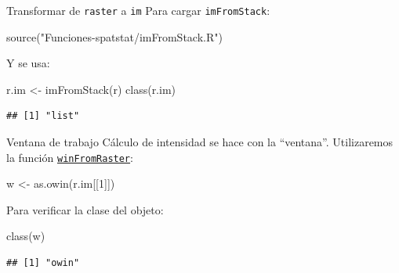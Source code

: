 \documentclass[
  11pt,
  ignorenonframetext,
]{beamer}
\newenvironment{Shaded}{}{}
\newcommand{\DecValTok}[1]{\textcolor[rgb]{0.25,0.63,0.44}{#1}}
\newcommand{\FunctionTok}[1]{\textcolor[rgb]{0.02,0.16,0.49}{#1}}
\newcommand{\NormalTok}[1]{#1}
\newcommand{\OtherTok}[1]{\textcolor[rgb]{0.00,0.44,0.13}{#1}}
\newcommand{\StringTok}[1]{\textcolor[rgb]{0.25,0.44,0.63}{#1}}
\begin{document}
\begin{frame}[fragile]{Transformar de \texttt{raster} a \texttt{im}}
\protect\hypertarget{transformar-de-raster-a-im-1}{}
Para cargar \texttt{imFromStack}:

\begin{Shaded}
\begin{Highlighting}[]
\FunctionTok{source}\NormalTok{(}\StringTok{"Funciones{-}spatstat/imFromStack.R"}\NormalTok{)}
\end{Highlighting}
\end{Shaded}

Y se usa:

\begin{Shaded}
\begin{Highlighting}[]
\NormalTok{r.im }\OtherTok{\textless{}{-}} \FunctionTok{imFromStack}\NormalTok{(r)}
\FunctionTok{class}\NormalTok{(r.im)}
\end{Highlighting}
\end{Shaded}

\begin{verbatim}
## [1] "list"
\end{verbatim}
\end{frame}

\begin{frame}[fragile]{Ventana de trabajo}
\protect\hypertarget{ventana-de-trabajo}{}
Cálculo de intensidad se hace con la ``ventana''. Utilizaremos la
función
\href{Funciones-spatstat/winFromRaster.R}{\texttt{winFromRaster}}:

\begin{Shaded}
\begin{Highlighting}[]
\NormalTok{w }\OtherTok{\textless{}{-}} \FunctionTok{as.owin}\NormalTok{(r.im[[}\DecValTok{1}\NormalTok{]])}
\end{Highlighting}
\end{Shaded}

Para verificar la clase del objeto:

\begin{Shaded}
\begin{Highlighting}[]
\FunctionTok{class}\NormalTok{(w)}
\end{Highlighting}
\end{Shaded}

\begin{verbatim}
## [1] "owin"
\end{verbatim}
\end{frame}
\end{document}
